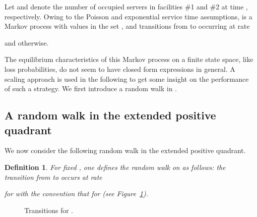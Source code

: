 \documentclass{amsart}
\newtheorem{definition}{Definition}
\begin{document}
Let  and  denote the number of occupied servers in facilities \#1 and \#2 at time , respectively. Owing to the Poisson and exponential service time assumptions,  is a Markov process with values in the set , and  
 transitions from  to  occurring at rate

and  otherwise. 

The equilibrium characteristics of this Markov process on a finite state space, like loss probabilities, do not seem to have closed form expressions in general. A scaling approach is used in the following to get some insight on the performance of such a strategy. We first introduce a random walk in . 

\subsection{A random walk in the extended positive quadrant}
We now consider the following random walk in the extended positive quadrant.

\begin{definition}\label{defim}
For fixed , one defines the random walk  on  as follows:  the transition from  to  occurs at rate

for  with the convention that  for  (see Figure~\ref{fig_transitions_ml}).
\end{definition}

\begin{figure}
\centering
{}
\caption{Transitions for .}
       \label{fig_transitions_ml}
\end{figure}
\end{document}
